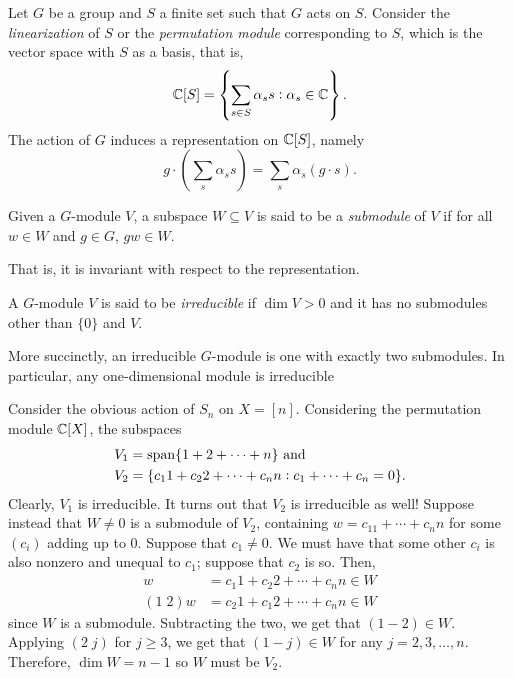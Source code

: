 	\begin{fex}
		Let $G$ be a group and $S$ a finite set such that $G$ acts on $S$. Consider the \emph{linearization} of $S$ or the \emph{permutation module} corresponding to $S$, which is the vector space with $S$ as a basis, that is,
		\[ \mathbb{C}[S] = \left\{ \sum_{s \in S} \alpha_s s : \alpha_s \in \mathbb{C} \right\}. \]
		The action of $G$ induces a representation on $\mathbb{C}[S]$, namely
		\[ g \cdot \left( \sum_s \alpha_s s \right) = \sum_s \alpha_s (g \cdot s). \] 
	\end{fex}

	\begin{fdef}
		Given a $G$-module $V$, a subspace $W \subseteq V$ is said to be a \emph{submodule} of $V$ if for all $w \in W$ and $g \in G$, $gw \in W$.
	\end{fdef}
	That is, it is invariant with respect to the representation.

	\begin{fdef}
		A $G$-module $V$ is said to be \emph{irreducible} if $\dim V > 0$ and it has no submodules other than $\{0\}$ and $V$.
	\end{fdef}
	More succinctly, an irreducible $G$-module is one with exactly two submodules. In particular, any one-dimensional module is irreducible

	\begin{fex}
		\label{ex:sn-action-permutation-mod}
		Consider the obvious action of $S_n$ on $X = [n]$. Considering the permutation module $\mathbb{C}[X]$, the subspaces
		\begin{align*}
			V_1 &= \operatorname{span}\{1+2+\cdots+n\} \text{ and} \\
			V_2 &= \{c_11 + c_22 + \cdots + c_nn : c_1 + \cdots + c_n = 0\}.
		\end{align*}
		Clearly, $V_1$ is irreducible. It turns out that $V_2$ is irreducible as well! Suppose instead that $W \ne 0$ is a submodule of $V_2$, containing $w = c_11 + \cdots + c_nn$ for some $(c_i)$ adding up to $0$. Suppose that $c_1 \ne 0$. We must have that some other $c_i$ is also nonzero and unequal to $c_1$; suppose that $c_2$ is so. Then,
		\begin{align*}
			w &= c_1 1 + c_2 2 + \cdots + c_nn \in W \\
			(1\; 2) w &= c_2 1 + c_1 2 + \cdots + c_n n \in W
		\end{align*}
		since $W$ is a submodule. Subtracting the two, we get that $(1-2) \in W$. Applying $(2\; j)$ for $j \ge 3$, we get that $(1-j) \in W$ for any $j = 2,3,\ldots,n$. Therefore, $\dim W = n-1$ so $W$ must be $V_2$.
	\end{fex}

